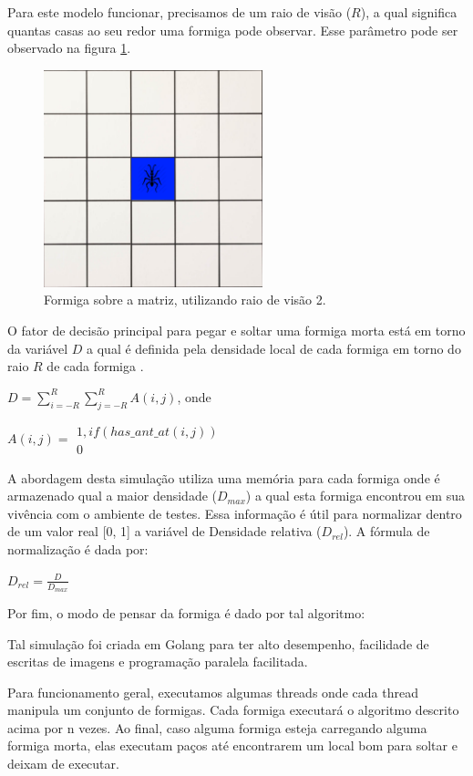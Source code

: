 \documentclass[conference]{IEEEtran}
\begin{document}
Para este modelo funcionar, precisamos de um raio de visão ($R$), a qual significa quantas casas ao seu redor uma formiga pode observar. Esse parâmetro pode ser observado na figura \ref{fig:raio}.

\begin{figure}[h]
\centering
\includegraphics[width=2.5in]{formiga.png}
\caption{Formiga sobre a matriz, utilizando raio de visão 2.}
\label{fig:raio}
\end{figure}

O fator de decisão principal para pegar e soltar uma formiga morta está em torno da variável $D$ a qual é definida pela densidade local de cada formiga em torno do raio $R$ de cada formiga \cite{b2}.


$D = \sum_{i=-R}^{R}\sum_{j=-R}^{R}A(i,j)$, onde

$A(i,j) =
\begin{array}{ll}
    1, if(has\_ant\_at(i,j))\\
    0
\end{array}
$

A abordagem desta simulação utiliza uma memória para cada formiga onde é armazenado qual a maior densidade ($D_{max}$) a qual esta formiga encontrou em sua vivência com o ambiente de testes. Essa informação é útil para normalizar dentro de um valor real [0, 1] a variável de Densidade relativa ($D_{rel}$). A fórmula de normalização é dada por\cite{b2}:

$
    D_{rel} = \frac{D}{D_{max}}
$

Por fim, o modo de pensar da formiga é dado por tal algoritmo:



Tal simulação foi criada em Golang para ter alto desempenho, facilidade de escritas de imagens e programação paralela facilitada.

Para funcionamento geral, executamos algumas threads onde cada thread manipula um conjunto de formigas. Cada formiga executará o algoritmo descrito acima por n vezes. Ao final, caso alguma formiga esteja carregando alguma formiga morta, elas executam paços até encontrarem um local bom para soltar e deixam de executar.
\end{document}
